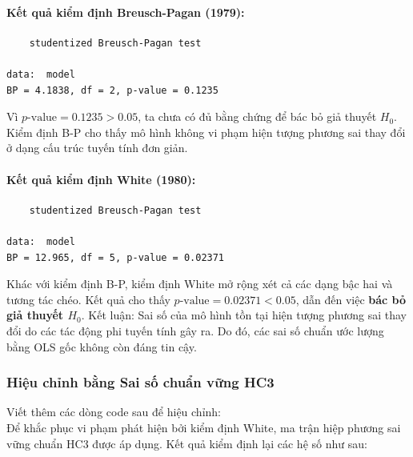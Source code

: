	\paragraph{Kết quả kiểm định Breusch-Pagan (1979):}
	\begin{verbatim}
	studentized Breusch-Pagan test

data:  model
BP = 4.1838, df = 2, p-value = 0.1235
	\end{verbatim}
	Vì $p\text{-value} = 0.1235 > 0.05$, ta chưa có đủ bằng chứng để bác bỏ giả thuyết $H_0$. Kiểm định B-P cho thấy mô hình không vi phạm hiện tượng phương sai thay đổi ở dạng cấu trúc tuyến tính đơn giản.
	
	\paragraph{Kết quả kiểm định White (1980):}
	\begin{verbatim}
	studentized Breusch-Pagan test

data:  model
BP = 12.965, df = 5, p-value = 0.02371
	\end{verbatim}
	Khác với kiểm định B-P, kiểm định White mở rộng xét cả các dạng bậc hai và tương tác chéo. Kết quả cho thấy $p\text{-value} = 0.02371 < 0.05$, dẫn đến việc \textbf{bác bỏ giả thuyết $H_0$}. Kết luận: Sai số của mô hình tồn tại hiện tượng phương sai thay đổi do các tác động phi tuyến tính gây ra. Do đó, các sai số chuẩn ước lượng bằng OLS gốc không còn đáng tin cậy.

	\subsubsection{Hiệu chỉnh bằng Sai số chuẩn vững HC3}
    Viết thêm các dòng code sau để hiệu chỉnh:\\
    \noindent{}
	Để khắc phục vi phạm phát hiện bởi kiểm định White, ma trận hiệp phương sai vững chuẩn HC3 được áp dụng. Kết quả kiểm định lại các hệ số như sau:
	
